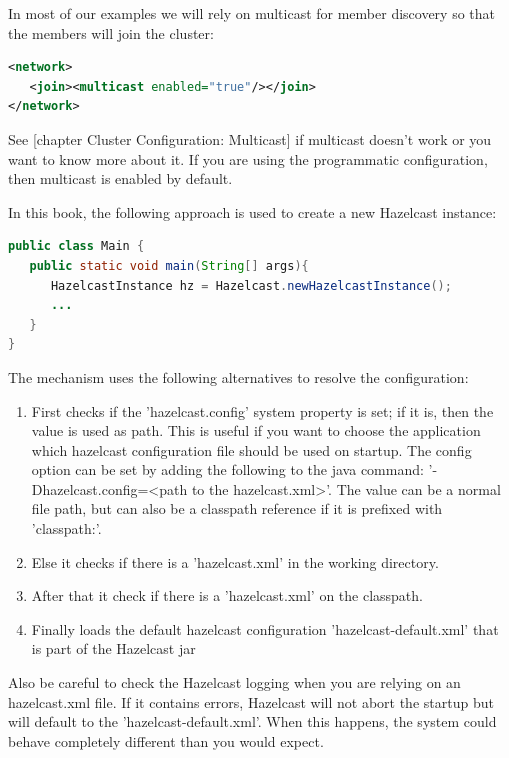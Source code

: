 In most of our examples we will rely on multicast for member discovery so that the members will join the cluster:
\begin{lstlisting}[language=xml]
<network>
   <join><multicast enabled="true"/></join>
</network>
\end{lstlisting}
See [chapter Cluster Configuration: Multicast] if multicast doesn't work or you want to know more about it. If you are using the programmatic configuration, then multicast is enabled by default.

In this book, the following approach is used to create a new Hazelcast instance:
\begin{lstlisting}[language=java]
public class Main {
   public static void main(String[] args){
      HazelcastInstance hz = Hazelcast.newHazelcastInstance();
      ...
   }
}
\end{lstlisting}
The mechanism uses the following alternatives to resolve the configuration:
\begin{enumerate}
\item First checks if the 'hazelcast.config' system property is set; if it is, then the value is used as path. This is useful if you want to choose the application which hazelcast configuration file should be used on startup. The config option can be set by adding the following to the java command: '-Dhazelcast.config=<path to the hazelcast.xml>'. The value can be a normal file path, but can also be a classpath reference if it is prefixed with 'classpath:'. 
\item Else it checks if there is a 'hazelcast.xml' in the working directory.
\item After that it check if there is a 'hazelcast.xml' on the classpath. 
\item Finally loads the default hazelcast configuration 'hazelcast-default.xml' that is part of the Hazelcast jar
\end{enumerate}
Also be careful to check the Hazelcast logging when you are relying on an hazelcast.xml file. If it contains errors, Hazelcast will not abort the startup but will default to the 'hazelcast-default.xml'. When this happens, the system could behave completely different than you would expect.

